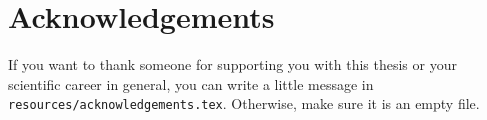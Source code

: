 \chapter*{Acknowledgements}

If you want to thank someone for supporting you with this thesis or your scientific career in general, you can write a little message in \texttt{resources/acknowledgements.tex}.
Otherwise, make sure it is an empty file.

